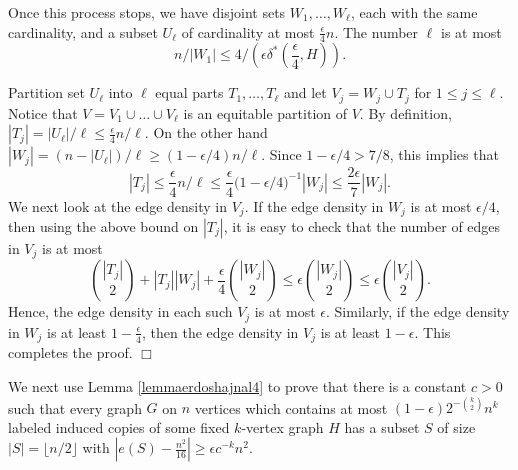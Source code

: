 \documentclass[11pt]{article}
\begin{document}
Once this process stops, we have disjoint sets
$W_1,\ldots,W_{\ell}$, each with the same cardinality, and a subset
$U_{\ell}$ of cardinality at most $\frac{\epsilon}{4}n$. The number
$\ell$ is at most $$n/|W_1| \leq 4/(\epsilon
\delta^*(\frac{\epsilon}{4},H)).$$

Partition set $U_\ell$ into $\ell$ equal parts $T_1, \ldots, T_\ell$
and let $V_j=W_j \cup T_j$ for $1 \leq j \leq \ell$.
Notice that $V=V_1 \cup \ldots \cup V_{\ell}$ is
an equitable partition of $V$. By definition,
$|T_j|=|U_\ell|/\ell \leq \frac{\epsilon}{4}n/\ell$.
On the other hand $|W_j|=(n-|U_\ell|)/\ell \geq (1-\epsilon/4)n/\ell$.
Since $1-\epsilon/4 >7/8$, this implies that
$$|T_j|\leq \frac{\epsilon}{4}n/\ell \leq \frac{\epsilon}{4}\big(1-\epsilon/4\big)^{-1}|W_j| \leq \frac{2\epsilon}{7}|W_j|.$$
We next look at the edge density in $V_j$. If the edge density in $W_j$ is at most $\epsilon/4$, then
using the above bound on $|T_j|$, it is easy to check that the number of edges in $V_j$ is at most
$${|T_j| \choose 2}+|T_j||W_j|+\frac{\epsilon}{4}{|W_j| \choose 2}
\leq \epsilon{|W_j| \choose 2} \leq \epsilon{|V_j| \choose 2}.$$
Hence, the edge density in each such $V_j$ is at most $\epsilon$.
Similarly, if the edge density in $W_j$ is at least
$1-\frac{\epsilon}{4}$, then the edge density in $V_j$ is at least
$1-\epsilon$. This completes the proof.
\hfill $\Box$

\vspace{0.2cm}
We next use Lemma \ref{lemmaerdoshajnal4} to prove that there is a constant $c>0$ such that
every graph $G$ on $n$ vertices which contains at most
$(1-\epsilon)2^{-{k \choose 2}}n^k$ labeled
induced copies of some fixed $k$-vertex graph $H$ has a subset
$S$ of size $|S|=\lfloor n/2 \rfloor$ with $|e(S)-\frac{n^2}{16}| \geq \epsilon
c^{-k} n^2$.
\end{document}
